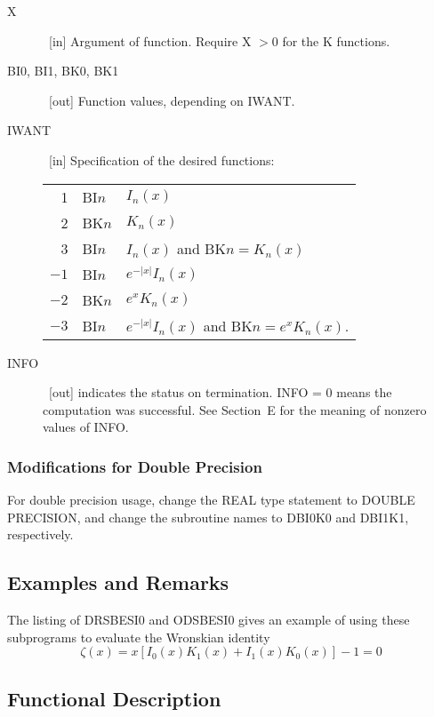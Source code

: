 \documentclass[twoside]{MATH77}
\begin{document}
\begin{description}
\item[X]  \ [in] Argument of function. Require X $>0$ for the K functions.

\item[BI0, BI1, BK0, BK1]  \ [out] Function values, depending on IWANT.

\item[IWANT]  \ [in] Specification of the desired functions:

\begin{tabular}{@{= }r@{: }l@{ = }l}
 1 & BI$n$ & $I_n(x)$\\
 2 & BK$n$ & $K_n(x)$\\
 3 & BI$n$ & $I_n(x)$ and BK$n = K_n(x)$\\
$-1$ & BI$n$ & $e^{-|x|} I_n(x)$\\
$-2$ & BK$n$ & $e^x K_n(x)$\\
$-3$ & BI$n$ & $e^{-|x|} I_n(x)$ and BK$n = e^x K_n(x).$
\end{tabular}

\item[INFO]  \ [out] indicates the status on termination.  INFO = 0
means the computation was successful.  See Section~E for the meaning
of nonzero values of INFO.
\end{description}

\subsubsection{Modifications for Double Precision}

For double precision usage, change the REAL type statement to DOUBLE
PRECISION, and change the subroutine names to DBI0K0 and DBI1K1, respectively.

\subsection{Examples and Remarks}

The listing of DRSBESI0 and ODSBESI0 gives an example of using these
subprograms to evaluate the Wronskian identity
\begin{equation*}
\zeta (x) = x[I_0(x)K_1(x)+I_1(x)K_0(x)] - 1 = 0
\end{equation*}

\subsection{Functional Description}
\end{document}
